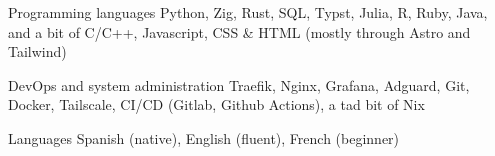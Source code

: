 

\begin{cvskills}

  \cvskill
    {Programming languages}
    {Python, Zig, Rust, SQL, Typst, Julia, R, Ruby, Java, and a bit of C/C++, Javascript, CSS & HTML (mostly through Astro and Tailwind)} %

  \cvskill
    {DevOps and system administration} %
    {Traefik, Nginx, Grafana, Adguard, Git, Docker, Tailscale, CI/CD (Gitlab, Github Actions), a tad bit of Nix}

  \cvskill
    {Languages} %
    {Spanish (native), English (fluent), French (beginner)} %

\end{cvskills}
